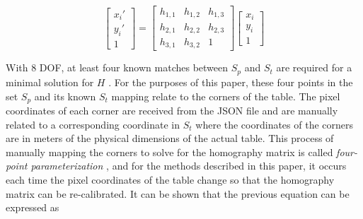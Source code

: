 \documentclass{article}
\begin{document}
          \begin{equation}
               \begin{bmatrix}
                    x_i'\\
                    y_i'\\
                    1
               \end{bmatrix}
               =
               \begin{bmatrix}
                    h_{1,1} & h_{1,2} & h_{1,3} \\
                    h_{2,1} & h_{2,2} & h_{2,3} \\
                    h_{3,1} & h_{3,2} & 1
               \end{bmatrix}
               \begin{bmatrix}
                    x_i\\
                    y_i\\
                    1
               \end{bmatrix}
          \label{eqn:homography1}
          \end{equation}
          \par With 8 DOF, at least four known matches between $S_p$ and $S_t$ are required for a minimal solution for $H$ \cite{GavaDfki,HomographyLab}. For the purposes of this paper, these four points in the set $S_p$ and its known $S_t$ mapping relate to the corners of the table. The pixel coordinates of each corner are received from the JSON file and are manually related to a corresponding coordinate in $S_t$ where the coordinates of the corners are in meters of the physical dimensions of the actual table. This process of manually mapping the corners to solve for the homography matrix is called \textit{four-point parameterization} \cite{Baker11}, and for the methods described in this paper, it occurs each time the pixel coordinates of the table change so that the homography matrix can be re-calibrated. It can be shown that the previous equation can be expressed as
\end{document}
